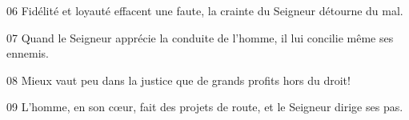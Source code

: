 
06 Fidélité et loyauté effacent une faute, la crainte du Seigneur détourne du mal.

07 Quand le Seigneur apprécie la conduite de l’homme, il lui concilie même ses ennemis.

08 Mieux vaut peu dans la justice que de grands profits hors du droit!

09 L’homme, en son cœur, fait des projets de route, et le Seigneur dirige ses pas.

